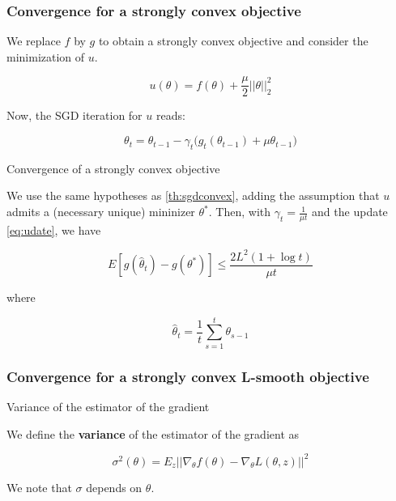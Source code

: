 \documentclass[
10pt, %
a4paper, %
oneside, %
headinclude,footinclude, %
BCOR5mm, %
]{scrartcl}
\begin{document}
\subsubsection{\large\color{Periwinkle}Convergence for a strongly convex objective}

We replace $f$ by $g$ to obtain a strongly convex objective and consider the minimization of $u$.

\begin{equation*}
    u(\theta) = f(\theta)+ \frac{\mu}{2} ||\theta||_2^2
\end{equation*}

Now, the SGD iteration for $u$ reads:

\begin{equation}
    \label{eq:udate}
    \theta_t = \theta_{t-1}- \gamma_t\big(g_t(\theta_{t-1})+\mu \theta_{t-1}\big)
\end{equation}

\begin{theorem}{Convergence of a strongly convex objective}

    We use the same hypotheses as \ref{th:sgdconvex}, adding the assumption
    that $u$ admits a (necessary unique) mininizer $\theta^*$. Then, with
    $\gamma_t =  \frac{1}{\mu t} $ and the update \ref{eq:udate}, we have

    \begin{equation}
	E[g( \hat{\theta}_t)-g(\theta^*)]\leq \frac{2L^2 (1+\log t)}{\mu t} 
    \end{equation}

    where 

    \begin{equation}
	\hat{\theta}_t = \frac{1}{t} \sum^{t}_{s=1} \theta_{s-1}
    \end{equation}

\end{theorem}

\subsubsection{\large\color{Periwinkle}Convergence for a strongly convex L-smooth objective}

\begin{definition}{Variance of the estimator of the gradient}

    We define the \textbf{{variance}} of the estimator of the gradient as

    \begin{equation}
	\sigma^2(\theta) = E_{z}|| \nabla_{\theta} f(\theta)- \nabla_{\theta}L(\theta, z)||^2
    \end{equation}

    We note that $\sigma $ depends on $ \theta$.
    
\end{definition}
\end{document}
